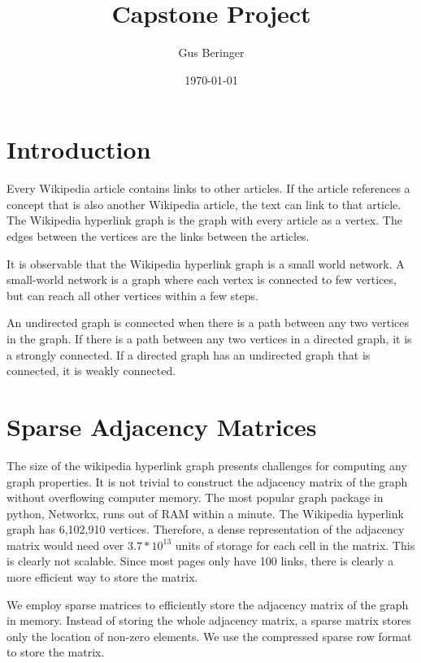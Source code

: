 \documentclass{article}
\author{Gus Beringer}
\title{Capstone Project}
\date{\today}
\begin{document}
\maketitle

\section{Introduction}

Every Wikipedia article contains links to other articles. If the article references a concept that is also another Wikipedia article, the text can link to that article.
The Wikipedia hyperlink graph is the graph with every article as a vertex. The edges between the vertices are the links between the articles.

It is observable that the Wikipedia hyperlink graph is a small world network.
A small-world network is a graph where each vertex is connected to few vertices, but can reach all other vertices within a few steps.

An undirected graph is connected when there is a path between any two vertices in the graph.
If there is a path between any two vertices in a directed graph, it is a strongly connected.
If a directed graph has an undirected graph that is connected, it is weakly connected.


\section{Sparse Adjacency Matrices}

The size of the wikipedia hyperlink graph presents challenges for computing any graph properties.
It is not trivial to construct the adjacency matrix of the graph without overflowing computer memory.
The most popular graph package in python, Networkx, runs out of RAM within a minute.
The Wikipedia hyperlink graph has 6,102,910 vertices.
Therefore, a dense representation of the adjacency matrix would need over $3.7 * 10^{13}$ units of storage for each cell in the matrix.
This is clearly not scalable.
Since most pages only have 100 links, there is clearly a more efficient way to store the matrix.

We employ sparse matrices to efficiently store the adjacency matrix of the graph in memory.
Instead of storing the whole adjacency matrix, a sparse matrix stores only the location of non-zero elements.
We use the compressed sparse row format to store the matrix.
\end{document}

